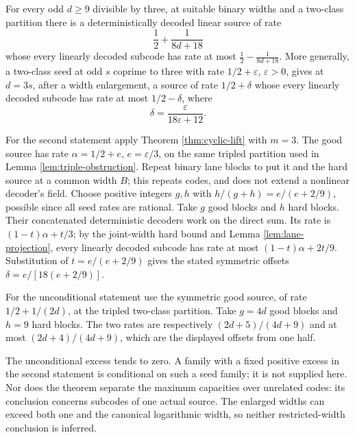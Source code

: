 \begin{theorem}\label{thm:subcode-barrier}
For every odd $d\ge9$ divisible by three, at suitable binary widths and
a two-class partition there is a deterministically decoded linear source
of rate
\[
 \frac12+\frac1{8d+18}
\]
whose every linearly decoded subcode has rate at most
$\frac12-\frac1{8d+18}$.
More generally, a two-class seed at odd $s$ coprime to three with rate
$1/2+\varepsilon$, $\varepsilon>0$, gives at $d=3s$, after a width
enlargement, a source of rate $1/2+\delta$ whose every linearly decoded
subcode has rate at most $1/2-\delta$, where
\[
 \delta=\frac{\varepsilon}{18\varepsilon+12}.
\]
\end{theorem}
\begin{outline}
For the second statement apply Theorem \ref{thm:cyclic-lift} with $m=3$.
The good source has rate $\alpha=1/2+e$, $e=\varepsilon/3$, on the same
tripled partition used in Lemma \ref{lem:triple-obstruction}.
Repeat binary lane blocks to put it and the hard source at a common width
$B$; this repeats codes, and does not extend a nonlinear decoder's field.
Choose positive integers $g,h$ with
$h/(g+h)=e/(e+2/9)$, possible since all seed rates are rational.
Take $g$ good blocks and $h$ hard blocks. Their concatenated deterministic
decoders work on the direct sum. Its rate is
$(1-t)\alpha+t/3$; by the joint-width hard bound and Lemma
\ref{lem:lane-projection}, every linearly decoded subcode has rate at
most $(1-t)\alpha+2t/9$. Substitution of $t=e/(e+2/9)$ gives the stated
symmetric offsets $\delta=e/[18(e+2/9)]$.

For the unconditional statement use the symmetric good source, of rate
$1/2+1/(2d)$, at the tripled two-class partition. Take $g=4d$ good blocks
and $h=9$ hard blocks. The two rates are respectively
$(2d+5)/(4d+9)$ and at most $(2d+4)/(4d+9)$, which are the displayed
offsets from one half.
\end{outline}

The unconditional excess tends to zero. A family with a fixed positive
excess in the second statement is conditional on such a seed family;
it is not supplied here. Nor does the theorem separate the maximum
capacities over unrelated codes: its conclusion concerns subcodes of
one actual source. The enlarged widths can exceed both one and the
canonical logarithmic width, so neither restricted-width conclusion is
inferred.
